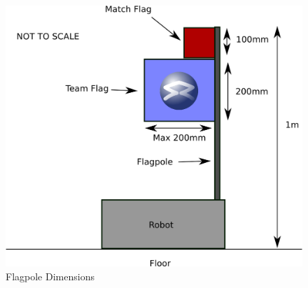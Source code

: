 \begin{figure}
\begin{center}
\includegraphics[keepaspectratio, scale =1]{./images/flag.png}
\caption{\label{fig:flag}Flagpole Dimensions}
\end{center}
\end{figure}
\clearpage

